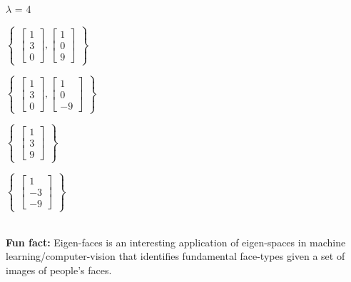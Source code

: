 \documentclass{exam}
\begin{document}
\begin{center}
\(\lambda\) = 4
\end{center}

\begin{oneparchoices}
  \choice $\begin{Bmatrix}
          \begin{bmatrix}
            1 \\
            3 \\
            0
          \end{bmatrix},
          \begin{bmatrix}
            1 \\
            0 \\
            9
          \end{bmatrix}
          \end{Bmatrix}$

  \choice $\begin{Bmatrix}
          \begin{bmatrix}
            1 \\
            3 \\
            0
          \end{bmatrix},
          \begin{bmatrix}
            1 \\
            0 \\
            -9
          \end{bmatrix}
          \end{Bmatrix}$

  \choice $\begin{Bmatrix} 
          \begin{bmatrix}
            1 \\
            3 \\ 
            9
          \end{bmatrix}
          \end{Bmatrix}$

  \choice $\begin{Bmatrix} 
          \begin{bmatrix}
            1 \\
            -3 \\
            -9
          \end{bmatrix}
          \end{Bmatrix}$
\end{oneparchoices}
\vspace{5mm}
\\
\textbf{Fun fact:} Eigen-faces is an interesting application of eigen-spaces in machine learning/computer-vision that identifies fundamental face-types
given a set of images of people's faces.
\end{document}
